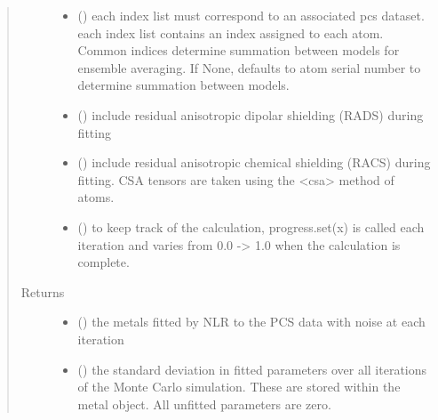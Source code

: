 \documentclass[a4paper,10pt,english]{sphinxmanual}
\begin{document}
\begin{fulllineitems}
\begin{quote}
\begin{description}
\begin{itemize}
\item {} 
 (\sphinxstyleliteralemphasis{\sphinxupquote{, }}) \textendash{} each index list must correspond to an associated pcs dataset.
each index list contains an index assigned to each atom.
Common indices determine summation between models
for ensemble averaging.
If None, defaults to atom serial number to determine summation
between models.

\item {} 
 (\sphinxstyleliteralemphasis{\sphinxupquote{, }}) \textendash{} include residual anisotropic dipolar shielding (RADS) during fitting

\item {} 
 (\sphinxstyleliteralemphasis{\sphinxupquote{, }}) \textendash{} include residual anisotropic chemical shielding (RACS) during fitting.
CSA tensors are taken using the \textless{}csa\textgreater{} method of atoms.

\item {} 
 (\sphinxstyleliteralemphasis{\sphinxupquote{, }}) \textendash{} to keep track of the calculation, progress.set(x) is called each
iteration and varies from 0.0 -\textgreater{} 1.0 when the calculation is complete.

\end{itemize}

\item[{Returns}] \leavevmode
\begin{itemize}
\item {} 
 () \textendash{} the metals fitted by NLR to the PCS data with noise at each iteration

\item {} 
 () \textendash{} the standard deviation in fitted parameters over all iterations of the
Monte Carlo simulation.
These are stored within the metal object. All unfitted parameters
are zero.

\end{itemize}


\end{description}\end{quote}

\end{fulllineitems}
\end{document}
